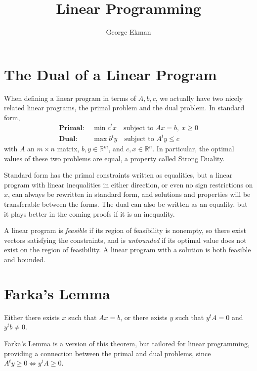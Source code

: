 \documentclass{article}
\title{Linear Programming}
\author{George Ekman}
\newcommand\R{{\mathbb{R}}}
\begin{document}
\maketitle

\section{The Dual of a Linear Program}

When defining a linear program in terms of $A, b, c$, we actually have two nicely related linear
programs, the primal problem and the dual problem. In standard form,
\begin{align*}
	\textbf{Primal: } & \min c^t x \quad \text{subject to } Ax = b,\ x \ge 0 \\
	\textbf{Dual: } & \max b^t y \quad \text{subject to } A^t y \le c
\end{align*}
with $A$ an $m \times n$ matrix, $b, y \in \R^m$, and $c, x \in \R^n$. In particular, the
optimal values of these two problems are equal, a property called Strong Duality.

Standard form has the primal constraints written as equalities, but a linear program with linear
inequalities in either direction, or even no sign restrictions on $x$, can always be rewritten in
standard form, and solutions and properties will be transferable between the forms. The dual can
also be written as an equality, but it plays better in the coming proofs if it is an inequality.

A linear program is \emph{feasible} if its region of feasibility is nonempty, so there exist
vectors satisfying the constraints, and is \emph{unbounded} if its optimal value does not exist on
the region of feasibility. A linear program with a solution is both feasible and bounded.

\section{Farka's Lemma}

\begin{theorem}
	\label{thm:funlinalg}%
	Either there exists $x$ such that $Ax = b$, or there exists $y$ such that $y^t A = 0$ and
	$y^t b \neq 0$.
\end{theorem}

Farka's Lemma is a version of this theorem, but tailored for linear programming, providing a
connection between the primal and dual problems, since $A^t y \ge 0 \iff y^t A \ge 0$.
\end{document}
